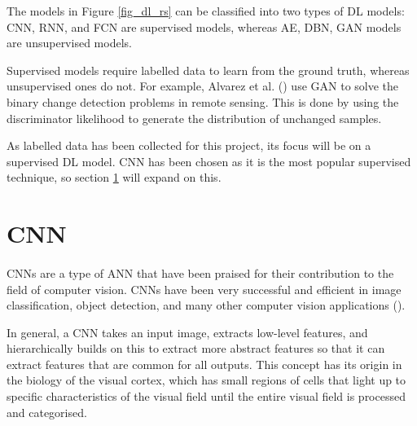 The models in Figure \ref{fig_dl_rs} can be classified into two types of \gls{DL} models: \gls{CNN}, \gls{RNN}, and \gls{FCN} are supervised models, whereas \gls{AE}, \gls{DBN}, \gls{GAN} models are unsupervised models. 

Supervised models require labelled data to learn from the ground truth, whereas unsupervised ones do not.  For example, Alvarez et al. (\cite{alvarez2020s2cgan}) use \gls{GAN} to solve the binary change detection problems in remote sensing. This is done by using the discriminator likelihood to generate the distribution of unchanged samples.

As labelled data has been collected for this project, its focus will be on a supervised \gls{DL} model. \gls{CNN} has been chosen as it is the most popular supervised technique, so section \ref{cnn_sect} will expand on this.



\section{\gls{CNN}} \label{cnn_sect}
\paragraph{}
\gls{CNN}s are a type of \gls{ANN} that have been praised for their contribution to the field of computer vision. \gls{CNN}s have been very successful and efficient in image classification, object detection, and many other computer vision applications (\cite{GoodBengCour16}).

In general, a \gls{CNN} takes an input image, extracts low-level features, and hierarchically builds on this to extract more abstract features so that it can extract features that are common for all outputs. This concept has its origin in the biology of the visual cortex, which has small regions of cells that light up to specific characteristics of the visual field until the entire visual field is processed and categorised.

